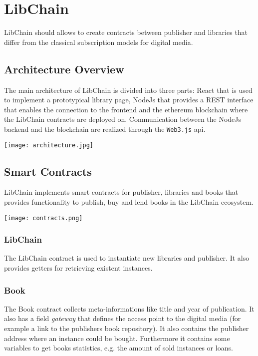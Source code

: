 \chapter{LibChain}
LibChain should allows to create contracts between publisher and libraries that differ from the classical subscription models for digital media. 

\section{Architecture Overview}
The main architecture of LibChain is divided into three parts: React that is used to implement a prototypical library page, NodeJs that provides a REST interface that enables the connection to the frontend and the ethereum blockchain where the LibChain contracts are deployed on. Communication between the NodeJs backend and the blockchain are realized through the \texttt{Web3.js} api.

\vspace{0.3cm}
\texttt{[image: architecture.jpg]}
\section{Smart Contracts}
LibChain implements smart contracts for publisher, libraries and books that provides functionality to publish, buy and lend books in the LibChain ecosystem. 


\vspace{0.3cm}
\texttt{[image: contracts.png]}

\subsection{LibChain}
The LibChain contract is used to instantiate new libraries and publisher. It also provides getters for retrieving existent instances.

\subsection{Book}
The Book contract collects meta-informations like title and year of publication. It also has a field \textit{gateway} that defines the access point to the digital media (for example a link to the publishers book repository). It also contains the publisher address where an instance could be bought. Furthermore it contains some variables to get books statistics, e.g. the amount of sold instances or loans.


